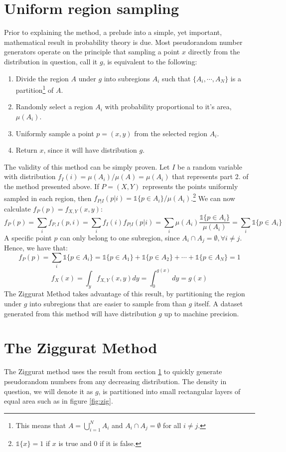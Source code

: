 \documentclass[11pt,onecolumn]{article}
\let\oldref\ref%
\def\ref{\oldref*}}
\begin{document}
\section{Uniform region sampling}\label{ugs}
Prior to explaining the method, a prelude into a simple, yet important, mathematical result in probability theory is due. Most pseudorandom number generators operate on the principle that sampling a point $x$ directly from the distribution in question, call it $g$, is equivalent to the following:
\begin{enumerate}
	\item Divide the region $A$ under $g$ into subregions $A_i$ such that $\{A_i, \dotsb, A_N\}$ is a partition\footnote{This means that $A=\bigcup_{i=1}^N A_i$ and $A_i \cap A_j=\emptyset$ for all $i\neq j$.} of $A$.
	\item Randomly select a region $A_i$ with probability proportional to it's area, $\mu(A_i)$.
	\item Uniformly sample a point $p=(x,y)$ from the selected region $A_i$.
	\item Return $x$, since it will have distribution $g$.
\end{enumerate}

The validity of this method can be simply proven. Let $I$ be a random variable with distribution $f_I(i)=\mu(A_i)/\mu(A)=\mu(A_i)$ that represents part 2. of the method presented above. If $P=(X,Y)$ represents the points uniformly sampled in each region, then $f_{P|I}(p|i)=\mathbb{1}\{p \in A_i\}/\mu(A_i)$.\footnote{$\mathbb{1}\{x\}=1$ if $x$ is true and $0$ if it is false.} We can now calculate $f_P(p)=f_{X,Y}(x,y)$:
$$f_P(p)=\sum_i f_{P,I}(p,i)=\sum_i f_I(i)f_{P|I}(p|i)=\sum_i \mu(A_i)\frac{\mathbb{1}\{p \in A_i\}}{\mu(A_i)}=\sum_i \mathbb{1}\{p \in A_i\}$$
A specific point $p$ can only belong to one subregion, since $A_i \cap A_j=\emptyset, \forall i\neq j$. Hence, we have that: 
$$f_P(p)=\sum_i \mathbb{1}\{p \in A_i\} = \mathbb{1}\{p \in A_1\} + \mathbb{1}\{p \in A_2\} + \dotsb + \mathbb{1}\{p \in A_N\} = 1$$
$$f_X(x)=\int_y f_{X,Y}(x,y)dy = \int_0^{g(x)}dy = g(x)$$
The Ziggurat Method takes advantage of this result, by partitioning the region under $g$ into subregions that are easier to sample from than $g$ itself. A dataset generated from this method will have distribution $g$ up to machine precision.

\section{The Ziggurat Method}
The Ziggurat method uses the result from section \ref{ugs} to quickly generate pseudorandom numbers from any decreasing distribution. The density in question, we will denote it as $g$, is partitioned into small rectangular layers of equal area such as in figure \ref{fig:zig}.
\end{document}
